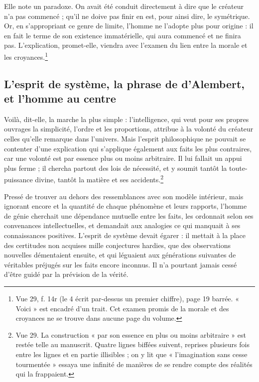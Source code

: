 \documentclass[11pt,a4paper]{article}
\begin{document}
Elle note un paradoxe. On avait été conduit directement à dire que le créateur
n'a pas commencé ; qu'il ne doive pas finir en est, pour ainsi dire, le
symétrique. Or, en s'appropriant ce genre de limite, l'homme ne l'adopte plus
pour origine : il en fait le terme de son existence immatérielle, qui aura
commencé et ne finira pas. L'explication, promet-elle, viendra avec l'examen du
lien entre la morale et les croyances.\footnote{Vue 29, f. 14r (le 4 écrit
par-dessus un premier chiffre), page 19 barrée. « Voici » est encadré d'un
trait. Cet examen promis de la morale et des croyances ne se trouve dans aucune
page du volume.}

\subsection*{L'esprit de système, la phrase de d'Alembert, et l'homme au centre}

Voilà, dit-elle, la marche la plus simple : l'intelligence, qui veut pour ses
propres ouvrages la simplicité, l'ordre et les proportions, attribue à la
volonté du créateur celles qu'elle remarque dans l'univers. Mais l'esprit
philosophique ne pouvait se contenter d'une explication qui s'applique
également aux faits les plus contraires, car une volonté est par essence plus
ou moins arbitraire. Il lui fallait un appui plus ferme ; il chercha partout
des lois de nécessité, et y soumit tantôt la toute-puissance divine, tantôt la
matière et ses accidents.\footnote{Vue 29. La construction « par son essence
en plus ou moins arbitraire » est restée telle au manuscrit. Quatre lignes
biffées suivent, reprises plusieurs fois entre les lignes et en partie
illisibles ; on y lit que « l'imagination sans cesse tourmentée » essaya une
infinité de manières de se rendre compte des réalités qui la frappaient.}

Pressé de trouver au dehors des ressemblances avec son modèle intérieur, mais
ignorant encore et la quantité de chaque phénomène et leurs rapports, l'homme
de génie cherchait une dépendance mutuelle entre les faits, les ordonnait
selon ses convenances intellectuelles, et demandait aux analogies ce qui
manquait à ses connaissances positives. L'esprit de système devait égarer :
il mettait à la place des certitudes non acquises mille conjectures hardies,
que des observations nouvelles démentaient ensuite, et qui léguaient aux
générations suivantes de véritables préjugés sur les faits encore inconnus. Il
n'a pourtant jamais cessé d'être guidé par la prévision de la vérité.
\end{document}
